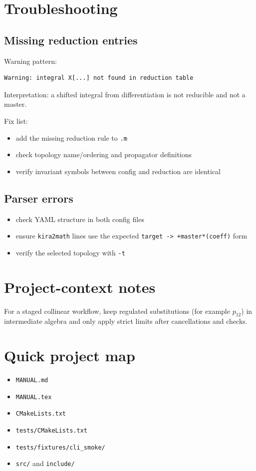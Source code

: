 \documentclass[11pt,openany]{report}
\newcommand{\code}[1]{\texttt{#1}}
\begin{document}
\chapter{Troubleshooting}

\section{Missing reduction entries}
Warning pattern:
\begin{verbatim}
Warning: integral X[...] not found in reduction table
\end{verbatim}

Interpretation: a shifted integral from differentiation is not reducible and not a master.

Fix list:
\begin{itemize}
  \item add the missing reduction rule to \code{.m}
  \item check topology name/ordering and propagator definitions
  \item verify invariant symbols between config and reduction are identical
\end{itemize}

\section{Parser errors}
\begin{itemize}
  \item check YAML structure in both config files
  \item ensure \code{kira2math} lines use the expected \code{target -> +master*(coeff)} form
  \item verify the selected topology with \code{-t}
\end{itemize}

\chapter{Project-context notes}
For a staged collinear workflow, keep regulated substitutions (for example \(p_{12}\))
in intermediate algebra and only apply strict limits after cancellations and checks.

\chapter{Quick project map}
\begin{itemize}
  \item \code{MANUAL.md}
  \item \code{MANUAL.tex}
  \item \code{CMakeLists.txt}
  \item \code{tests/CMakeLists.txt}
  \item \code{tests/fixtures/cli\_smoke/}
  \item \code{src/} and \code{include/}
\end{itemize}
\end{document}
